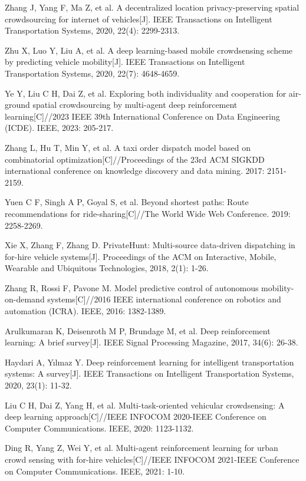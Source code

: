 \begin{thebibliography}{00}
 Zhang J, Yang F, Ma Z, et al. A decentralized location privacy-preserving spatial crowdsourcing for internet of vehicles[J]. IEEE Transactions on Intelligent Transportation Systems, 2020, 22(4): 2299-2313.

 Zhu X, Luo Y, Liu A, et al. A deep learning-based mobile crowdsensing scheme by predicting vehicle mobility[J]. IEEE Transactions on Intelligent Transportation Systems, 2020, 22(7): 4648-4659.

 Ye Y, Liu C H, Dai Z, et al. Exploring both individuality and cooperation for air-ground spatial crowdsourcing by multi-agent deep reinforcement learning[C]//2023 IEEE 39th International Conference on Data Engineering (ICDE). IEEE, 2023: 205-217.

 Zhang L, Hu T, Min Y, et al. A taxi order dispatch model based on combinatorial optimization[C]//Proceedings of the 23rd ACM SIGKDD international conference on knowledge discovery and data mining. 2017: 2151-2159.

 Yuen C F, Singh A P, Goyal S, et al. Beyond shortest paths: Route recommendations for ride-sharing[C]//The World Wide Web Conference. 2019: 2258-2269.

 Xie X, Zhang F, Zhang D. PrivateHunt: Multi-source data-driven dispatching in for-hire vehicle systems[J]. Proceedings of the ACM on Interactive, Mobile, Wearable and Ubiquitous Technologies, 2018, 2(1): 1-26.

 Zhang R, Rossi F, Pavone M. Model predictive control of autonomous mobility-on-demand systems[C]//2016 IEEE international conference on robotics and automation (ICRA). IEEE, 2016: 1382-1389.

 Arulkumaran K, Deisenroth M P, Brundage M, et al. Deep reinforcement learning: A brief survey[J]. IEEE Signal Processing Magazine, 2017, 34(6): 26-38.

 Haydari A, Yılmaz Y. Deep reinforcement learning for intelligent transportation systems: A survey[J]. IEEE Transactions on Intelligent Transportation Systems, 2020, 23(1): 11-32.

 Liu C H, Dai Z, Yang H, et al. Multi-task-oriented vehicular crowdsensing: A deep learning approach[C]//IEEE INFOCOM 2020-IEEE Conference on Computer Communications. IEEE, 2020: 1123-1132.

 Ding R, Yang Z, Wei Y, et al. Multi-agent reinforcement learning for urban crowd sensing with for-hire vehicles[C]//IEEE INFOCOM 2021-IEEE Conference on Computer Communications. IEEE, 2021: 1-10.


\end{thebibliography}
